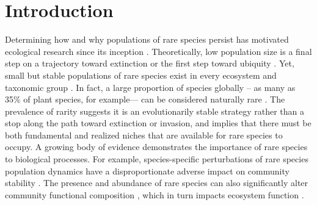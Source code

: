 \documentclass[12pt, letterpaper]{article}
\begin{document}
\section{Introduction}
Determining how and why populations of rare species persist has motivated ecological research since its inception \cite{Levins1971RegionalSpecies, Drury1974RareSpecies}. Theoretically, low population size is a final step on a trajectory toward extinction \cite{Stanley1979Macroevolution:Process, Rosenzweig1997TheRarity} or the first step toward ubiquity \cite{Spear2021}.  Yet, small but stable populations of rare species exist in every ecosystem and taxonomic group \cite{Magurran2011CommonnessRarity}. In fact, a large proportion of species globally – as many as 35\% of plant species, for example— can be considered naturally rare \cite{Enquist2019ThePlants}. The prevalence of rarity suggests it is an evolutionarily stable strategy rather than a stop along the path toward extinction or invasion, and implies that there must be both fundamental and realized niches that are available for rare species to occupy. A growing body of evidence demonstrates the importance of rare species to biological processes. For example, species-specific perturbations of rare species population dynamics have a disproportionate adverse impact on community stability \cite{Arnoldi2019ThePatterns, Saterberg2019ADynamics}. The presence and abundance of rare species can also significantly alter community functional composition \cite{Leitao2016RareAssemblages, Burner2022FunctionalSpecies}, which in turn impacts ecosystem function \cite{Lyons2005RareFunctioning}. 
\end{document}
